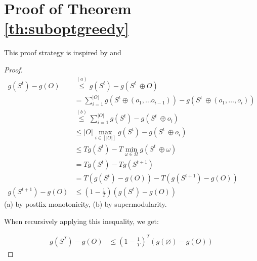 \documentclass[12pt]{article}
\begin{document}

\section{Proof of Theorem \ref{th:suboptgreedy}}

This proof strategy is inspired by \cite{streeter2008online} and \cite{liberty2017greedy}

\begin{proof}

\begin{align*}
    g(S^t) -g(O) &\overset{(a)}{\leq} g(S^t) -g(S^t\ \oplus O) \\
    &=\sum_{i = 1}^{|O|} g(S^t \oplus \left(o_1, \dots o_{i - 1}\right)) -g(S^t\ \oplus \left(o_1, \dots, o_{i}\right))\\
    &\overset{(b)}{\leq} \sum_{i = 1}^{|O|} g(S^t) -g(S^t\ \oplus  o_{i}) \\
    &\leq |O|\max_{i \in [|O|]} g(S^t) -g(S^t\ \oplus  o_{i}) \\
    &\leq  Tg(S^t) -  T\min_{\omega \in \Omega} g(S^t\ \oplus  \omega) \\
    &= Tg(S^t) -  Tg(S^{t + 1}) \\
    &= T \left(g(S^t) - g(O)\right) - T\left(g(S^{t + 1}) -g(O)\right) \\
    g(S^{t + 1}) -g(O) &\leq \left(1 - \frac{1}{T}\right)\left(g(S^t) - g(O)\right)
\end{align*}
(a) by postfix monotonicity, (b) by supermodularity. 

When recursively applying this inequality, we get:

\begin{align*}
     g(S^{T}) -g(O) &\leq \left(1 - \frac{1}{T}\right)^T\left(g(\varnothing) - g(O)\right)
\end{align*}
\end{proof}
\end{document}
